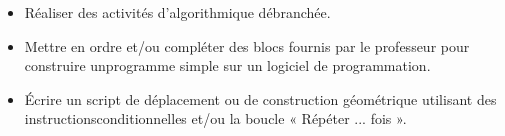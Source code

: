 \documentclass[a4paper,12pt,fleqn]{article}	
\begin{document}
\renewcommand{\labelitemi}{}

\begin{itemize}
	\item {}Réaliser des activités d’algorithmique débranchée.
	\item {}Mettre en ordre et/ou compléter des blocs fournis par le professeur pour construire unprogramme simple sur un logiciel de programmation.
	\item {}Écrire un script de déplacement ou de construction géométrique utilisant des instructionsconditionnelles et/ou la boucle « Répéter ... fois ».
\end{itemize}
	
\end{document}
